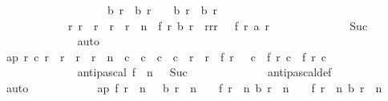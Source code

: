 \begin{isabellebody}
\ \ \ \ \ \ \ \ \ \ \ \ \ \ \ \ \ \ \ {\isacharparenleft}b\ r\ {\isacharequal}\ b\ {\isacharparenleft}r\ {\isacharminus}\ {}{\isacharparenright}\ {\isasymor}\ b\ r\ {\isacharequal}\ b\ {\isacharparenleft}r\ {\isacharminus}\ {}{\isacharparenright}\ {\isacharplus}\ {}{\isacharparenright}{\isachardoublequoteclose}\isanewline
\ \ \ \ \ \ \ \ \ \ \ \ {\isachardoublequoteopen}{\isasymforall}r{\isachardot}\ r{}\ {\isasymle}\ r\ {\isasymand}\ r\ {\isacharless}\ r{}\ {\isacharplus}\ n\ {\isasymlongrightarrow}\ f\ r\ {\isacharparenleft}b\ r{\isacharparenright}\ {\isacharequal}\ {\isacharparenleft}{\isasymSum}r{\isacharprime}{\isasymleftarrow}{\isacharbrackleft}r{}{\isachardot}{\isachardot}{\isacharless}r\ {\isacharplus}\ {}{\isacharbrackright}{\isachardot}\ f\ r{\isacharprime}\ {\isacharparenleft}a\ r{\isacharprime}{\isacharparenright}{\isacharparenright}{\isachardoublequoteclose}\isanewline
\ \ \ \ \ \ \ \ \ \ \ \ \isamarkupfalse%
\ Suc\isanewline
\ \ \ \ \ \ \ \ \ \ \ \ \isamarkupfalse%
\ auto\isanewline
\isanewline
\ \ \ \ \ \ \ \ \ \ \isamarkupfalse%
\ ap{\isacharprime}{\isacharcolon}\ {\isachardoublequoteopen}{\isasymforall}r\ c{\isachardot}\ r{}\ {\isasymle}\ r\ {\isasymand}\ r\ {\isasymle}\ r{}\ {\isacharplus}\ n\ {\isasymand}\ c{}\ {\isasymle}\ c\ {\isasymand}\ c\ {\isacharless}\ c{}\ {\isacharplus}\ {\isacharparenleft}r\ {\isacharminus}\ r{}{\isacharparenright}\ {\isasymlongrightarrow}\ f\ {\isacharparenleft}r\ {\isacharminus}\ {}{\isacharparenright}\ c\ {\isacharequal}\ {\isasymbar}f\ r\ c\ {\isacharminus}\ f\ r\ {\isacharparenleft}c\ {\isacharplus}\ {}{\isacharparenright}{\isasymbar}{\isachardoublequoteclose}\isanewline
\ \ \ \ \ \ \ \ \ \ \ \ \isamarkupfalse%
\ {\isacharbackquoteopen}antipascal\ f\ {}{}{}{}{\isacharbackquoteclose}\ {\isacharbackquoteopen}n\ {\isasymnoteq}\ {}{\isacharbackquoteclose}\ Suc{\isacharparenleft}{}{\isacharminus}{}{\isacharparenright}\isanewline
\ \ \ \ \ \ \ \ \ \ \ \ \isamarkupfalse%
\ antipascal{\isacharunderscore}def\isanewline
\ \ \ \ \ \ \ \ \ \ \ \ \isamarkupfalse%
\ auto\isanewline
\ \ \ \ \ \ \ \ \ \ \isamarkupfalse%
\ ap{\isacharcolon}\ {\isachardoublequoteopen}f\ {\isacharparenleft}r{}\ {\isacharplus}\ n\ {\isacharminus}\ {}{\isacharparenright}\ {\isacharparenleft}b\ {\isacharparenleft}r{}\ {\isacharplus}\ n\ {\isacharminus}\ {}{\isacharparenright}{\isacharparenright}\ {\isacharequal}\ {\isasymbar}f\ {\isacharparenleft}r{}\ {\isacharplus}\ n{\isacharparenright}\ {\isacharparenleft}b\ {\isacharparenleft}r{}\ {\isacharplus}\ n\ {\isacharminus}\ {}{\isacharparenright}{\isacharparenright}\ {\isacharminus}\ f\ {\isacharparenleft}r{}\ {\isacharplus}\ n{\isacharparenright}\ {\isacharparenleft}b\ {\isacharparenleft}r{}\ {\isacharplus}\ n\ {\isacharminus}\ {}{\isacharparenright}\ {\isacharplus}\ {}{\isacharparenright}{\isasymbar}{\isachardoublequoteclose}\isanewline

\end{isabellebody}
